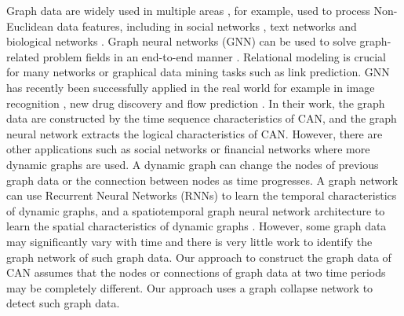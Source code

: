 \documentclass[lettersize,journal]{IEEEtran}
\begin{document}
Graph data are widely used in multiple areas \cite{7,8}, for example, used to process Non-Euclidean data features, including in social networks \cite{9}, text networks \cite{10} and biological networks \cite{11}. Graph neural networks (GNN) can be used to solve graph-related problem fields in an end-to-end manner \cite{12}. Relational modeling is crucial for many networks or graphical data mining tasks such as link prediction. GNN has recently been successfully applied in the real world for example in image recognition  \cite{13}, new drug discovery \cite{14} and flow prediction \cite{15}. In their work, the graph data are constructed by the time sequence characteristics of CAN, and the graph neural network extracts the logical characteristics of CAN. However, there are other applications such as social networks or financial networks where more dynamic graphs are used. A dynamic graph can change the nodes of previous graph data or the connection between nodes as time progresses. A graph network can use Recurrent Neural Networks (RNNs) \cite{16, 17} to learn the temporal characteristics of dynamic graphs, and a spatiotemporal graph neural network architecture to learn the spatial characteristics of dynamic graphs \cite{18}. However, some graph data may significantly vary with time and there is very little work to identify the graph network of such graph data. Our approach to construct the graph data of CAN assumes that the nodes or connections of graph data at two time periods may be completely different. Our approach uses a graph collapse network \cite{19} to detect such graph data.
\end{document}

